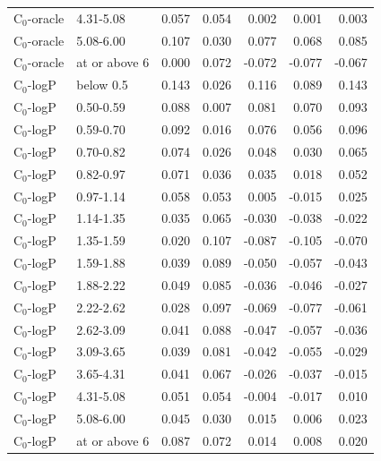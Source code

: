 \begin{longtable}{llrrrrr}
C$_0$-oracle & 4.31-5.08 & 0.057 & 0.054 & 0.002 & 0.001 & 0.003 \\
C$_0$-oracle & 5.08-6.00 & 0.107 & 0.030 & 0.077 & 0.068 & 0.085 \\
C$_0$-oracle & at or above 6 & 0.000 & 0.072 & -0.072 & -0.077 & -0.067 \\
C$_0$-logP & below 0.5 & 0.143 & 0.026 & 0.116 & 0.089 & 0.143 \\
C$_0$-logP & 0.50-0.59 & 0.088 & 0.007 & 0.081 & 0.070 & 0.093 \\
C$_0$-logP & 0.59-0.70 & 0.092 & 0.016 & 0.076 & 0.056 & 0.096 \\
C$_0$-logP & 0.70-0.82 & 0.074 & 0.026 & 0.048 & 0.030 & 0.065 \\
C$_0$-logP & 0.82-0.97 & 0.071 & 0.036 & 0.035 & 0.018 & 0.052 \\
C$_0$-logP & 0.97-1.14 & 0.058 & 0.053 & 0.005 & -0.015 & 0.025 \\
C$_0$-logP & 1.14-1.35 & 0.035 & 0.065 & -0.030 & -0.038 & -0.022 \\
C$_0$-logP & 1.35-1.59 & 0.020 & 0.107 & -0.087 & -0.105 & -0.070 \\
C$_0$-logP & 1.59-1.88 & 0.039 & 0.089 & -0.050 & -0.057 & -0.043 \\
C$_0$-logP & 1.88-2.22 & 0.049 & 0.085 & -0.036 & -0.046 & -0.027 \\
C$_0$-logP & 2.22-2.62 & 0.028 & 0.097 & -0.069 & -0.077 & -0.061 \\
C$_0$-logP & 2.62-3.09 & 0.041 & 0.088 & -0.047 & -0.057 & -0.036 \\
C$_0$-logP & 3.09-3.65 & 0.039 & 0.081 & -0.042 & -0.055 & -0.029 \\
C$_0$-logP & 3.65-4.31 & 0.041 & 0.067 & -0.026 & -0.037 & -0.015 \\
C$_0$-logP & 4.31-5.08 & 0.051 & 0.054 & -0.004 & -0.017 & 0.010 \\
C$_0$-logP & 5.08-6.00 & 0.045 & 0.030 & 0.015 & 0.006 & 0.023 \\
C$_0$-logP & at or above 6 & 0.087 & 0.072 & 0.014 & 0.008 & 0.020 \\
\end{longtable}
\endgroup
